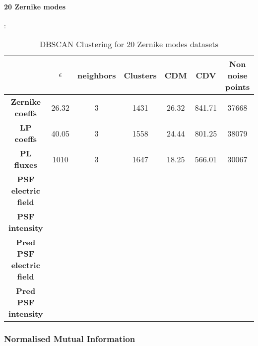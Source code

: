 		\paragraph{20 Zernike modes}:
		\begin{table}[h!]
			\centering
			\begin{tabular}{|c|c|c|c|c|c|c|}
				\hline
				\textbf{} & \textbf{$\epsilon$} & \textbf{neighbors} & \textbf{Clusters} & \textbf{CDM} & \textbf{CDV} & \textbf{Non noise points}\\
				\hline
				\textbf{Zernike coeffs} & 26.32 & 3 & 1431 & 26.32 & 841.71 & 37668 \\
				\hline
				\textbf{LP coeffs} & 40.05 & 3 & 1558 & 24.44 & 801.25 & 38079 \\
				\hline
				\textbf{PL fluxes} & 1010 & 3 & 1647 & 18.25 & 566.01 & 30067 \\
				\hline
				\textbf{PSF electric field} &  &  &  &  &  &  \\
				\hline
				\textbf{PSF intensity} &  &  &  &  &  &  \\
				\hline
				\textbf{Pred PSF electric field} &  &  &  &  &  &  \\
				\hline
				\textbf{Pred PSF intensity} &  &  &  &  &  &  \\
				\hline
			\end{tabular}
		\caption{DBSCAN Clustering for 20 Zernike modes datasets}
		\end{table}
		\FloatBarrier
		
		
	\subsubsection{Normalised Mutual Information}
		
